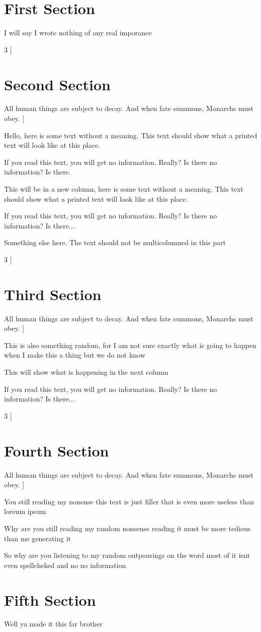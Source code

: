 \documentclass{article}
\begin{document}
\section{First Section}
I will say I wrote nothing of any real imporance 

\begin{multicols}{3}
[
\section{Second Section}
All human things are subject to decay. And when fate summons, Monarchs must obey.
]

Hello, here is some text without a meaning.  This text should show what 
a printed text will look like at this place.

If you read this text, you will get no information.  Really?  Is there 
no information?  Is there.

\columnbreak

This will be in a new column, here is some text without a meaning.  This text 
should show what a printed text will look like at this place.

If you read this text, you will get no information.  Really?  Is there 
no information?  Is there...
\end{multicols}

Something else here. The text should not be multicolumned in this part

\begin{multicols}{3}
[
\section{Third Section}
All human things are subject to decay. And when fate summons, Monarchs must obey.
]

This is also something random, for I am not sure exactly what is going to happen when I make this a thing
but we do not know 

\columnbreak

This will show what is happening in the next column

If you read this text, you will get no information.  Really?  Is there 
no information?  Is there...
\end{multicols}

\begin{multicols}{3}
[
\section{Fourth Section}
All human things are subject to decay. And when fate summons, Monarchs must obey.
]

You still reading my nonense this text is just filler that is even more useless than loreum ipsum 

\columnbreak

Why are you still reading my random nonsense reading it must be more tedious than me generating it 

So why are you listening to my random outpourings on the word most of it isnt even spellcheked and no 
no information
\end{multicols}

\section{Fifth Section}
Well ya made it this far brother 
\end{document}
